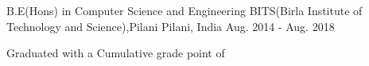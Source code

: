

\begin{cventries}

  \cventry
    {B.E(Hons) in Computer Science and Engineering} %
    {BITS(Birla Institute of Technology and Science),Pilani} %
    {Pilani, India} %
    {Aug. 2014 - Aug. 2018} %
    {
      \begin{cvitems} %
        \item {Graduated with a Cumulative grade point of }
      \end{cvitems}
    }

\end{cventries}
